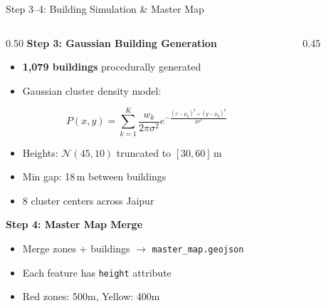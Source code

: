 \documentclass[aspectratio=169, 11pt]{beamer}
\begin{document}
\begin{frame}{Step 3--4: Building Simulation \& Master Map}
\begin{columns}[T]
\begin{column}{0.50\textwidth}
\textcolor{neongreen}{\textbf{Step 3: Gaussian Building Generation}}\\[0.2cm]
\small
\begin{itemize}
    \item \textbf{1,079 buildings} procedurally generated
    \item Gaussian cluster density model:
\end{itemize}
$$P(x,y) = \sum_{k=1}^{K} \frac{w_k}{2\pi\sigma^2} e^{-\frac{(x-\mu_k)^2 + (y-\mu_k)^2}{2\sigma^2}}$$
\begin{itemize}
    \item Heights: $\mathcal{N}(45, 10)$ truncated to $[30, 60]$\,m
    \item Min gap: 18\,m between buildings
    \item 8 cluster centers across Jaipur
\end{itemize}

\vspace{0.3cm}
\textcolor{accentblue}{\textbf{Step 4: Master Map Merge}}\\[0.2cm]
\small
\begin{itemize}
    \item Merge zones + buildings $\rightarrow$ \texttt{master\_map.geojson}
    \item Each feature has \texttt{height} attribute
    \item Red zones: 500m, Yellow: 400m
\end{itemize}
\end{column}
\begin{column}{0.45\textwidth}
\end{column}
\end{columns}
\end{frame}
\end{document}
